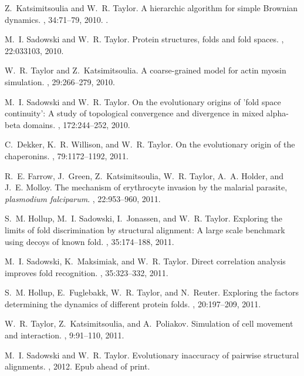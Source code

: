 \begin{thebibliography}{100}
Z.~Katsimitsoulia and W.~R. Taylor.
\newblock A hierarchic algorithm for simple {B}rownian dynamics.
, 34:71--79, 2010.
.

M.~I. Sadowski and W.~R. Taylor.
\newblock Protein structures, folds and fold spaces.
, 22:033103, 2010.

W.~R. Taylor and Z.~Katsimitsoulia.
\newblock A coarse-grained model for actin myosin simulation.
, 29:266--279, 2010.

M.~I. Sadowski and W.~R. Taylor.
\newblock On the evolutionary origins of 'fold space continuity': A study of
  topological convergence and divergence in mixed alpha-beta domains.
, 172:244--252, 2010.

C.~Dekker, K.~R. Willison, and W.~R. Taylor.
\newblock On the evolutionary origin of the chaperonins.
, 79:1172--1192, 2011.

R.~E. Farrow, J.~Green, Z.~Katsimitsoulia, W.~R. Taylor, A.~A. Holder, and
  J.~E. Molloy.
\newblock The mechanism of erythrocyte invasion by the malarial parasite, {\em
  {p}lasmodium falciparum}.
, 22:953--960, 2011.

S.~M. Hollup, M.~I. Sadowski, I.~Jonassen, and W.~R. Taylor.
\newblock Exploring the limits of fold discrimination by structural alignment:
  A large scale benchmark using decoys of known fold.
, 35:174--188, 2011.

M.~I. Sadowski, K.~Maksimiak, and W.~R. Taylor.
\newblock Direct correlation analysis improves fold recognition.
, 35:323--332, 2011.

S.~M. Hollup, E.~Fuglebakk, W.~R. Taylor, and N.~Reuter.
\newblock Exploring the factors determining the dynamics of different protein
  folds.
, 20:197--209, 2011.

W.~R. Taylor, Z.~Katsimitsoulia, and A.~Poliakov.
\newblock Simulation of cell movement and interaction.
, 9:91--110, 2011.

M.~I. Sadowski and W.~R. Taylor.
\newblock Evolutionary inaccuracy of pairwise structural alignments.
, 2012.
\newblock Epub ahead of print.


\end{thebibliography}
